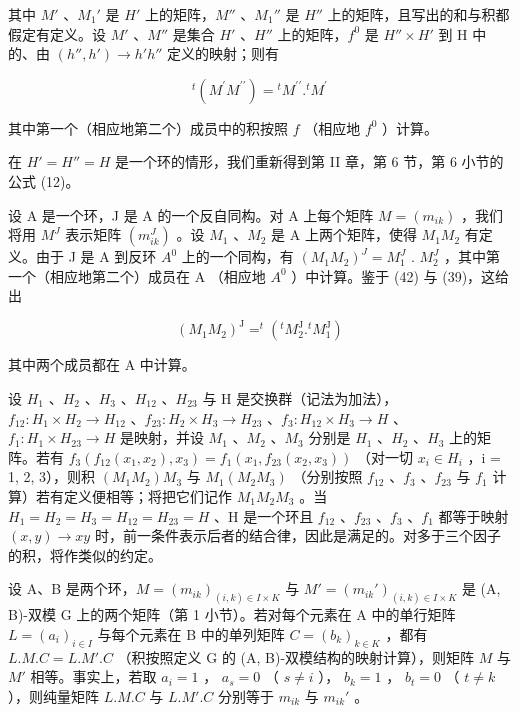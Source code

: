 其中 \(M'\) 、\(M_1'\) 是 \(H'\) 上的矩阵，\(M''\) 、\(M_1''\) 是 \(H''\) 上的矩阵，且写出的和与积都假定有定义。设 \(M'\) 、\(M''\) 是集合 \(H'\) 、\(H''\) 上的矩阵，\(f^0\) 是 \(H'' \times H'\) 到 H 中的、由 \((h'', h') \to h' h''\) 定义的映射；则有

\[
{ } ^ { t } ( M ^ { \prime } M ^ { \prime \prime } ) = { } ^ { t } M ^ { \prime \prime } . { } ^ { t } M ^ { \prime }\tag{42}
\]

其中第一个（相应地第二个）成员中的积按照 \(f\) （相应地 \(f^{0}\) ）计算。

在 \(H' = H'' = H\) 是一个环的情形，我们重新得到第 II 章，第 6 节，第 6 小节的公式 (12)。

设 A 是一个环，J 是 A 的一个反自同构。对 A 上每个矩阵 \(M = (m_{ik})\) ，我们将用 \(M^{J}\) 表示矩阵 \((m_{ik}^{J})\) 。设 \(M_{1}\) 、\(M_{2}\) 是 A 上两个矩阵，使得 \(M_{1}M_{2}\) 有定义。由于 J 是 A 到反环 \(A^{0}\) 上的一个同构，有 \((M_{1}M_{2})^{J} = M_{1}^{J}\) . \(M_{2}^{J}\) ，其中第一个（相应地第二个）成员在 A （相应地 \(A^{0}\) ）中计算。鉴于 (42) 与 (39)，这给出

\[
(M _ {1} M _ {2}) ^ {\mathrm{J}} = ^ {t} (^ {t} M _ {2} ^ {\mathrm{J}}. ^ {t} M _ {1} ^ {\mathrm{J}})\tag{43}
\]

其中两个成员都在 A 中计算。

设 \(H_{1}\) 、\(H_{2}\) 、\(H_{3}\) 、\(H_{12}\) 、\(H_{23}\) 与 H 是交换群（记法为加法），\(f_{12}: H_{1} \times H_{2} \to H_{12}\) 、\(f_{23}: H_{2} \times H_{3} \to H_{23}\) 、\(f_{3}: H_{12} \times H_{3} \to H\) 、\(f_{1}: H_{1} \times H_{23} \to H\) 是映射，并设 \(M_{1}\) 、\(M_{2}\) 、\(M_{3}\) 分别是 \(H_{1}\) 、\(H_{2}\) 、\(H_{3}\) 上的矩阵。若有 \(f_{3}(f_{12}(x_{1}, x_{2}), x_{3}) = f_{1}(x_{1}, f_{23}(x_{2}, x_{3}))\) （对一切 \(x_{i} \in H_{i}\) ，i = 1, 2, 3），则积 \((M_{1}M_{2})M_{3}\) 与 \(M_{1}(M_{2}M_{3})\) （分别按照 \(f_{12}\) 、\(f_{3}\) 、\(f_{23}\) 与 \(f_{1}\) 计算）若有定义便相等；将把它们记作 \(M_{1}M_{2}M_{3}\) 。当 \(H_{1} = H_{2} = H_{3} = H_{12} = H_{23} = H\) 、H 是一个环且 \(f_{12}\) 、\(f_{23}\) 、\(f_{3}\) 、\(f_{1}\) 都等于映射 \((x, y) \to xy\) 时，前一条件表示后者的结合律，因此是满足的。对多于三个因子的积，将作类似的约定。

设 A、B 是两个环，\(M = (m_{ik})_{(i,k) \in I \times K}\) 与 \(M' = (m_{ik}')_{(i,k) \in I \times K}\) 是 (A, B)-双模 G 上的两个矩阵（第 1 小节）。若对每个元素在 A 中的单行矩阵 \(L = (a_i)_{i \in I}\) 与每个元素在 B 中的单列矩阵 \(C = (b_k)_{k \in K}\) ，都有 \(L.M.C = L.M'.C\) （积按照定义 G 的 (A, B)-双模结构的映射计算），则矩阵 \(M\) 与 \(M'\) 相等。事实上，若取 \(a_i = 1\) ， \(a_s = 0\) （ \(s \neq i\) ）， \(b_k = 1\) ， \(b_t = 0\) （ \(t \neq k\) ），则纯量矩阵 \(L.M.C\) 与 \(L.M'.C\) 分别等于 \(m_{ik}\) 与 \(m_{ik}'\) 。

